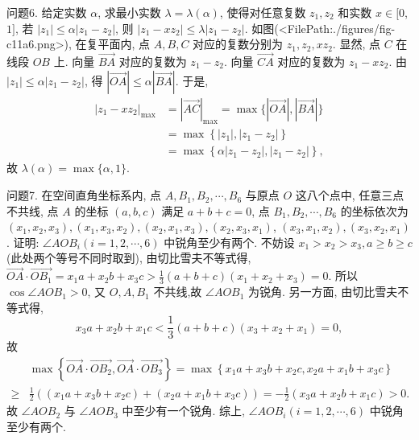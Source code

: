 问题6. 给定实数 $\alpha$, 求最小实数 $\lambda=\lambda(\alpha)$, 使得对任意复数 $z_1, z_2$ 和实数 $x \in[0$, $1]$, 若 $\left|z_1\right| \leqslant \alpha\left|z_1-z_2\right|$, 则 $\left|z_1-x z_2\right| \leqslant \lambda\left|z_1-z_2\right|$.
如图(<FilePath:./figures/fig-c11a6.png>), 在复平面内, 点 $A, B, C$ 对应的复数分别为 $z_1, z_2, x z_2$. 显然, 点 $C$ 在线段 $O B$ 上.
向量 $\overrightarrow{B A}$ 对应的复数为 $z_1-z_2$. 向量 $\overrightarrow{C A}$ 对应的复数为 $z_1-x z_2$. 由 $\left|z_1\right| \leqslant \alpha\left|z_1-z_2\right|$, 得 $|\overrightarrow{O A}| \leqslant \alpha|\overrightarrow{B A}|$. 于是,
$$
\begin{aligned}
\left|z_1-x z_2\right|_{\max } & =|\overrightarrow{A C}|_{\max }=\max \{|\overrightarrow{O A}|,|\overrightarrow{B A}|\} \\
& =\max \left\{\left|z_1\right|,\left|z_1-z_2\right|\right\} \\
& =\max \left\{\alpha\left|z_1-z_2\right|,\left|z_1-z_2\right|\right\},
\end{aligned}
$$
故 $\lambda(\alpha)=\max \{\alpha, 1\}$.



问题7. 在空间直角坐标系内, 点 $A, B_1, B_2, \cdots, B_6$ 与原点 $O$ 这八个点中, 任意三点不共线, 点 $A$ 的坐标 $(a, b, c)$ 满足 $a+b+c=0$, 点 $B_1, B_2, \cdots, B_6$ 的坐标依次为 $\left(x_1, x_2, x_3\right),\left(x_1, x_3, x_2\right),\left(x_2, x_1, x_3\right),\left(x_2, x_3, x_1\right)$, $\left(x_3, x_1, x_2\right),\left(x_3, x_2, x_1\right)$. 证明: $\angle A O B_i(i=1,2, \cdots, 6)$ 中锐角至少有两个.
不妨设 $x_1>x_2>x_3, a \geqslant b \geqslant c$ (此处两个等号不同时取到), 由切比雪夫不等式得, $\overrightarrow{O A} \cdot \overrightarrow{O B_1}=x_1 a+x_2 b+x_3 c>\frac{1}{3}(a+b+c)\left(x_1+x_2+x_3\right)=0$. 所以 $\cos \angle A O B_1>0$, 又 $O, A, B_1$ 不共线,故 $\angle A O B_1$ 为锐角.
另一方面, 由切比雪夫不等式得,
$$
x_3 a+x_2 b+x_1 c<\frac{1}{3}(a+b+c)\left(x_3+x_2+x_1\right)=0,
$$
故
$$
\begin{aligned}
& \max \left\{\overrightarrow{O A} \cdot \overrightarrow{O B_2}, \overrightarrow{O A} \cdot \overrightarrow{O B_3}\right\}=\max \left\{x_1 a+x_3 b+x_2 c, x_2 a+x_1 b+x_3 c\right\} \\
\geqslant & \frac{1}{2}\left(\left(x_1 a+x_3 b+x_2 c\right)+\left(x_2 a+x_1 b+x_3 c\right)\right)=-\frac{1}{2}\left(x_3 a+x_2 b+x_1 c\right)>0 .
\end{aligned}
$$
故 $\angle A O B_2$ 与 $\angle A O B_3$ 中至少有一个锐角.
综上, $\angle A O B_i(i=1,2, \cdots, 6)$ 中锐角至少有两个.



